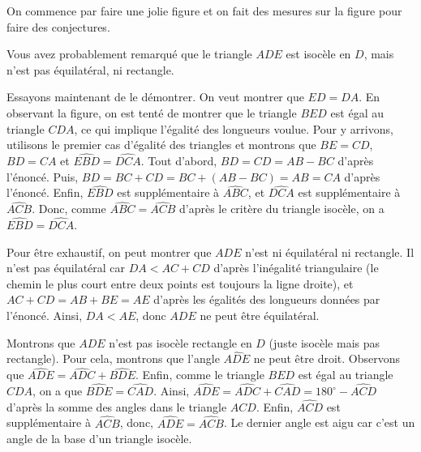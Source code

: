 \begin{sol}
On commence par faire une jolie figure et on fait des mesures sur la figure pour faire des conjectures.
\begin{figure}[H]
\end{figure}
Vous avez probablement remarqué que le triangle $ADE$ est isocèle en $D$, mais n'est pas équilatéral, ni rectangle.

Essayons maintenant de le démontrer. On veut montrer que $ED=DA$. En observant la figure, on est tenté de montrer que le triangle $BED$ est égal au triangle $CDA$, ce qui implique l'égalité des longueurs voulue. Pour y arrivons, utilisons le premier cas d'égalité des triangles et montrons que $BE=CD$, $BD=CA$ et $\widehat{EBD}=\widehat{DCA}$. Tout d'abord, $BD=CD=AB-BC$ d'après l'énoncé. Puis, $BD=BC+CD=BC+(AB-BC)=AB=CA$ d'après l'énoncé. Enfin, $\widehat{EBD}$ est supplémentaire à $\widehat{ABC}$, et $\widehat{DCA}$ est supplémentaire à $\widehat{ACB}$. Donc, comme $\widehat{ABC}=\widehat{ACB}$ d'après le critère du triangle isocèle, on a $\widehat{EBD}=\widehat{DCA}$.

Pour être exhaustif, on peut montrer que $ADE$ n'est ni équilatéral ni rectangle. Il n'est pas équilatéral car $DA<AC+CD$ d'après l'inégalité triangulaire (le chemin le plus court entre deux points est toujours la ligne droite), et $AC+CD=AB+BE=AE$ d'après les égalités des longueurs données par l'énoncé. Ainsi, $DA<AE$, donc $ADE$ ne peut être équilatéral.

Montrons que $ADE$ n'est pas isocèle rectangle en $D$ (juste isocèle mais pas rectangle). Pour cela, montrons que l'angle $\widehat{ADE}$ ne peut être droit. Observons que $\widehat{ADE}=\widehat{ADC}+\widehat{BDE}$. Enfin, comme le triangle $BED$ est égal au triangle $CDA$, on a que $\widehat{BDE}=\widehat{CAD}$. Ainsi, $\widehat{ADE}=\widehat{ADC}+\widehat{CAD}=180^\circ-\widehat{ACD}$ d'après la somme des angles dans le triangle $ACD$. Enfin, $\widehat{ACD}$ est supplémentaire à $\widehat{ACB}$, donc, $\widehat{ADE}=\widehat{ACB}$. Le dernier angle est aigu car c'est un angle de la base d'un triangle isocèle.
\end{sol}

